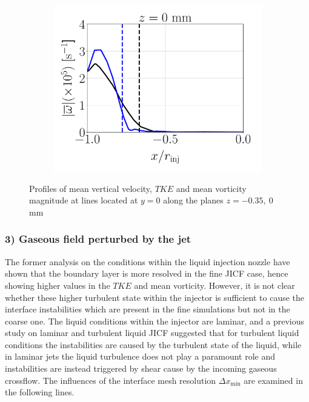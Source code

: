 \begin{figure}[ht]
\begin{subfigure}[b]{0.3\textwidth}
	\flushleft
   \includegraphics[scale=0.225]{./part2_developments/figures_ch5_resolved_JICF/instabilities_resolution/line_data_injector_vort_z0p00}
\end{subfigure}

   \caption{Profiles of mean vertical velocity, $TKE$ and mean vorticity magnitude at lines located at $y = 0$ along the planes $z = -0.35,~0$ mm}
\label{fig:jicf_data_lines_inside_injector}
\end{figure}


\subsubsection*{3) Gaseous field perturbed by the jet}


The former analysis on the conditions within the liquid injection nozzle have shown that the boundary layer is more resolved in the fine JICF case, hence showing higher values in the $TKE$ and mean vorticity. However, it is not clear whether these higher turbulent state within the injector is sufficient to cause the interface instabilities which are present in the fine simulations but not in the coarse one. The liquid conditions within the injector are laminar, and a previous study on laminar and turbulent liquid JICF  suggested that for turbulent liquid conditions the instabilities are caused by the turbulent state of the liquid, while in laminar jets the liquid turbulence does not play a paramount role and instabilities are instead triggered by shear cause by the incoming gaseous crossflow. The influences of the interface mesh resolution $\Delta x_\mathrm{min}$ are examined in the following lines.



